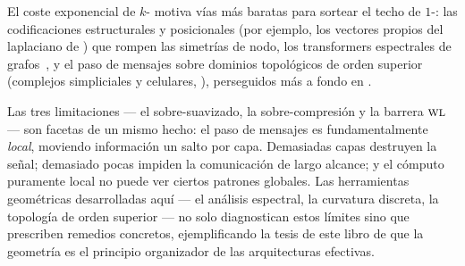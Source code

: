 El coste exponencial de $k$-\WL{} motiva v\'ias m\'as baratas para sortear el techo
de $1$-\WL: las codificaciones estructurales y posicionales (por ejemplo, los
vectores propios del laplaciano de ) que rompen las
simetr\'ias de nodo, los transformers espectrales de
grafos~\citep{kreuzer2021spectral}, y el paso de mensajes sobre dominios
topol\'ogicos de orden superior (complejos simpliciales y celulares,
), perseguidos m\'as a fondo en
.

\medskip
Las tres limitaciones --- el sobre-suavizado, la sobre-compresi\'on y la barrera
$\textsc{wl}$ --- son facetas de un mismo hecho: el paso de mensajes es fundamentalmente
\emph{local}, moviendo informaci\'on un salto por capa. Demasiadas capas destruyen
la se\~nal; demasiado pocas impiden la comunicaci\'on de largo alcance; y el
c\'omputo puramente local no puede ver ciertos patrones globales. Las herramientas
geom\'etricas desarrolladas aqu\'i --- el an\'alisis espectral, la curvatura
discreta, la topolog\'ia de orden superior --- no solo diagnostican estos
l\'imites sino que prescriben remedios concretos, ejemplificando la tesis de este
libro de que la geometr\'ia es el principio organizador de las arquitecturas
efectivas.
